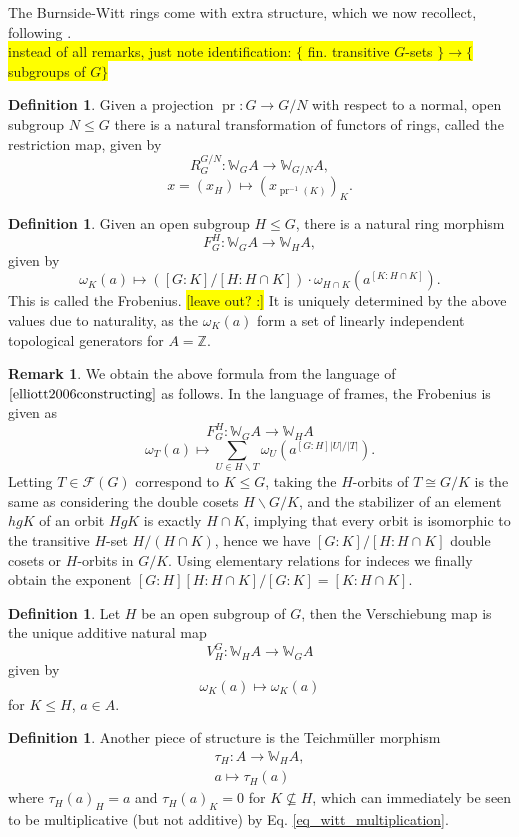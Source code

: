 \documentclass[10pt, a4paper, UKenglish]{article}
\numberwithin{equation}{section}
\newcommand{\cF}{\mathcal{F}}
\newcommand{\bW}{\mathbb{W}}
\newcommand{\bZ}{\mathbb{Z}}
\newcommand{\abs}[1]{\left\vert#1\right\vert}	%
\renewcommand{\subset}{\subseteq}
\newcommand{\pr}{\operatorname{pr}}
\newcommand{\comm}[1]{\colorbox{yellow}{#1}}
\theoremstyle{plain}
\theoremstyle{definition}
\newtheorem{defn}[equation]{Definition}
\newtheorem{rem}[equation]{Remark}
\renewcommand{\to}{\longrightarrow}
\renewcommand{\mapsto}{\longmapsto}
\begin{document}
%
%
The Burnside-Witt rings come with extra structure, which we now recollect, following \cite{elliott2006constructing}.\\
\comm{instead of all remarks, just note identification: $\{$ fin. transitive $G$-sets $\} \to \{$ subgroups of $G \}$}
\begin{defn}\label{def_witt_res}
Given a projection $\pr: G \to G/N$ with respect to a normal, open subgroup $N \leq G$ there is a natural transformation of functors of rings, called the restriction map, given by
\[	R_G^{G/N}: \bW_G A \to \bW_{G/N} A,\]
\[	x = (x_H) \mapsto (x_{\pr^{-1}(K)})_K.	\]
\end{defn}
\begin{defn}\label{def_witt_frob}
Given an open subgroup $H \leq G$, there is a natural ring morphism
\[	F_G^H: \bW_G A \to \bW_H A, \]
given by
\[	\omega_K(a) \mapsto ( [G:K]/[H: H \cap K]) \cdot \omega_{H \cap K} (a^{[K : H \cap K]}).	\]
This is called the Frobenius. \comm{[leave out? :]} It is uniquely determined by the above values due to naturality, as the $\omega_K(a)$ form a set of linearly independent topological generators for $A = \bZ$.
\end{defn}
\begin{rem}
We obtain the above formula from the language of $\cite{elliott2006constructing}$ as follows. In the language of frames, the Frobenius is given as
\[	F_G^H: \bW_G A \to \bW_H A	\]
\[	\omega_T(a) \mapsto \sum_{U \in H \backslash T} \omega_U( a^{ [G:H] \abs{U} / \abs{T} } ).\]
Letting $T \in \cF(G)$ correspond to $K \leq G$, taking the $H$-orbits of $T \cong G/K$ is the same as considering the double cosets $H \backslash G / K$, and the stabilizer of an element $hgK$ of an orbit $HgK$ is exactly $H \cap K$, implying that every orbit is isomorphic to the transitive $H$-set $H/(H \cap K)$, hence we have $[G:K]/[H: H \cap K]$ double cosets or $H$-orbits in $G/K$. Using elementary relations for indeces we finally obtain the exponent $[G:H] [H:H \cap K] / [G:K] = [K : H \cap K]$.
\end{rem}
\begin{defn}\label{def_witt_vers}
Let $H$ be an open subgroup of $G$, then the Verschiebung map is the unique additive natural map
	\[	V_H^G : \bW_H A \to \bW_G A \]
given by
	\[ \omega_K (a) \mapsto \omega_K (a) \]
for $K \leq H$, $a \in A$.
\end{defn}
%
%
\begin{defn}\label{def_teichmueller_burnside_witt_vectors}
Another piece of structure is the Teichm\"uller morphism
\begin{gather*}
	\tau_H: A \to \bW_H A,\\%
	a \mapsto \tau_H(a)
\end{gather*}
where $\tau_H(a)_H = a$ and $\tau_H(a)_K = 0$ for $K \not\subset H$, which can immediately be seen to be multiplicative (but not additive) by Eq. \ref{eq_witt_multiplication}.
\end{defn}
\end{document}
